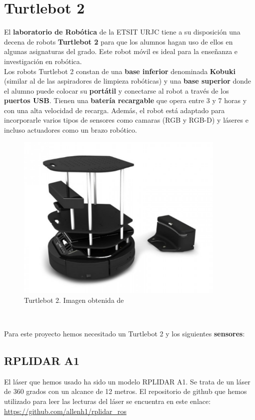 \section{Turtlebot 2}
\label{sec:turtlebot2}

El \textbf{laboratorio de Robótica} de la ETSIT URJC tiene a su disposición una decena de robots \textbf{Turtlebot 2} para que los alumnos hagan uso de ellos en algunas asignaturas del grado. Este robot móvil es ideal para la enseñanza e investigación en robótica.\\

Los robots Turtlebot 2 constan de una \textbf{base inferior} denominada \textbf{Kobuki} (similar al de las aspiradores de limpieza robóticas) y una \textbf{base superior} donde el alumno puede colocar su \textbf{portátil} y conectarse al robot a través de los \textbf{puertos USB}. Tienen una \textbf{batería recargable} que opera entre 3 y 7 horas y con una alta velocidad de recarga. Además, el robot está adaptado para incorporarle varios tipos de sensores como camaras (RGB y RGB-D) y láseres e incluso actuadores como un brazo robótico.\\

\begin{figure} [H]
  \begin{center}
    \includegraphics[width=10cm]{imagenes/turtlebot2-real.png}
  \end{center}
  \caption[Turtlebot 2]{Turtlebot 2. Imagen obtenida de \cite{turtlebot2}}
  \label{fig:turtlebot2_real}
\end{figure}\

Para este proyecto hemos necesitado un Turtlebot 2 y los siguientes \textbf{sensores}:
\subsection{RPLIDAR A1}
\label{subsec:rplidar_a1}
El láser que hemos usado ha sido un modelo RPLIDAR A1. Se trata de un láser de 360 grados con un alcance de 12 metros. El repositorio de github que hemos utilizado para leer las lecturas del láser se encuentra en este enlace: \url{https://github.com/allenh1/rplidar_ros}\\

